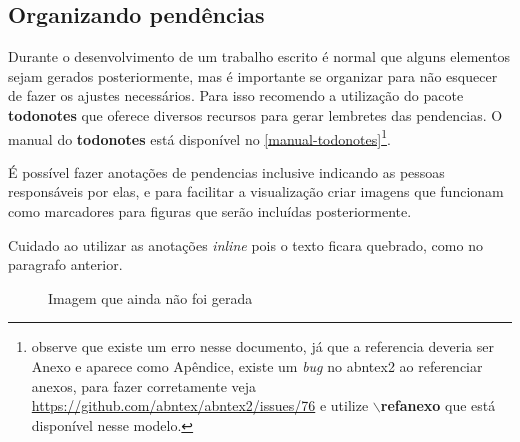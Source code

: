 \subsection{Organizando pendências}

Durante o desenvolvimento de um trabalho escrito é normal que alguns elementos sejam gerados posteriormente, mas é importante se organizar para não esquecer de fazer os ajustes necessários. Para isso recomendo a utilização do pacote \textbf{todonotes} que oferece diversos recursos para gerar lembretes das pendencias. O manual do \textbf{todonotes} está disponível no \autoref{manual-todonotes}\footnote{observe que existe um erro nesse documento, já que a referencia deveria ser Anexo e aparece como Apêndice,  existe um \emph{bug} no abntex2 ao referenciar anexos, para fazer corretamente veja \url{https://github.com/abntex/abntex2/issues/76} e utilize \textbf{$\backslash$refanexo} que está disponível nesse modelo.}.

É possível fazer anotações de pendencias inclusive indicando as pessoas responsáveis por elas, %
 e para facilitar a visualização criar imagens que funcionam como marcadores para figuras que serão incluídas posteriormente.

Cuidado ao utilizar as anotações \emph{inline} pois o texto ficara quebrado, como no paragrafo anterior.


\begin{figure}[htb]
    \centering
	\caption{\label{fig_todo1}Imagem que ainda não foi gerada}
\end{figure}


